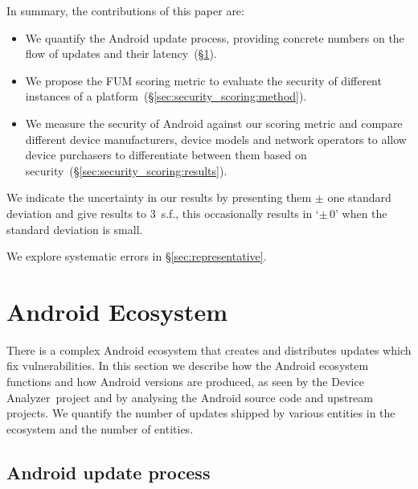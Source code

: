 \documentclass{sig-alternate-2013}
\let\OldTodo\todo
\renewcommand{\todo}{\OldTodo[inline]}
\newcommand{\todolater}[1]{}%
\newcommand{\da}{Device Analyzer}
\begin{document}
In summary, the contributions of this paper are:
\begin{itemize}
 \item We quantify the Android update process, providing concrete numbers on the flow of updates and their latency~(\S\ref{sec:android_ecosystem}).
 \item We propose the FUM scoring metric to evaluate the security of different instances of a platform~(\S\ref{sec:security_scoring:method}).
 \item We measure the security of Android against our scoring metric and compare different device manufacturers, device models and network operators to allow device purchasers to differentiate between them based on security~(\S\ref{sec:security_scoring:results}).
\end{itemize}

We indicate the uncertainty in our results by presenting them $\pm$ one standard deviation and give results to 3~s.f., this occasionally results in `$\pm\, 0$' when the standard deviation is small.
\todolater{Do we want to use the 95 percentile instead}
We explore systematic errors in \S\ref{sec:representative}.

\section{Android Ecosystem}\label{sec:android_ecosystem}
There is a complex Android ecosystem that creates and distributes updates which fix vulnerabilities.
In this section we describe how the Android ecosystem functions and how Android versions are produced, as seen by the \da\ project and by analysing the Android source code and upstream projects.
We quantify the number of updates shipped by various entities in the ecosystem and the number of entities.


\subsection{Android update process}
\end{document}
